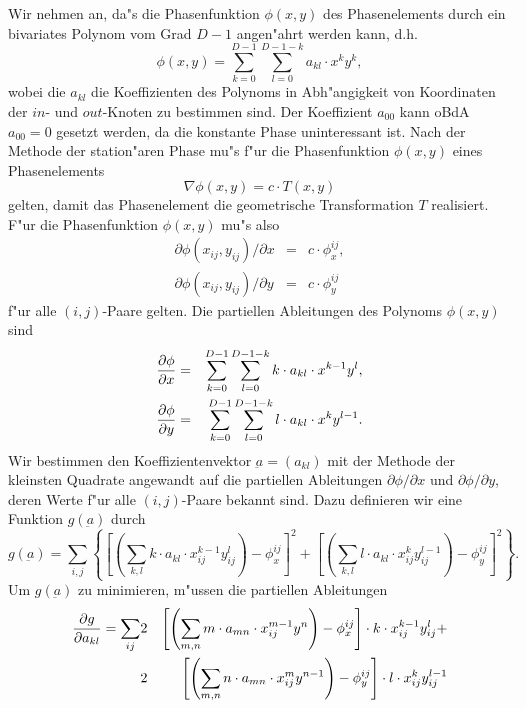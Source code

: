 \documentclass[11pt,a4paper]{article}
\begin{document}
    Wir nehmen an, da"s die Phasenfunktion $\phi(x,y)$ des Phasenelements durch ein bivariates Polynom vom 
    Grad $D-1$ angen"ahrt werden kann, d.h.
    $$ \phi(x,y) = \sum_{k=0}^{D-1}\sum_{l=0}^{D-1-k} a_{kl}\cdot x^k y^k, $$
    wobei die $a_{kl}$ die Koeffizienten des Polynoms in Abh"angigkeit von Koordinaten der
    $in$- und $out$-Knoten zu bestimmen sind. Der Koeffizient $a_{00}$ kann oBdA $a_{00}=0$ gesetzt werden,
    da die konstante Phase uninteressant ist. Nach der Methode der station"aren Phase mu"s f"ur 
    die Phasenfunktion $\phi(x,y)$ eines Phasenelements
    $$ \nabla \phi(x,y) = c \cdot T(x,y)$$
    gelten, damit das Phasenelement die geometrische Transformation $T$ realisiert. 
    F"ur die Phasenfunktion $\phi(x,y)$ mu"s also 
    \begin{eqnarray*}
      \partial\phi(x_{ij},y_{ij})/\partial x & = & c\cdot \phi_x^{ij}, \\
      \partial\phi(x_{ij},y_{ij})/\partial y & = & c\cdot \phi_y^{ij} 
    \end{eqnarray*}
    f"ur alle $(i,j)$-Paare gelten. Die partiellen Ableitungen des Polynoms $\phi(x,y)$ sind
    \begin{eqnarray*}
      {\partial\phi\over\partial x} & = & 
      \sum_{k=0}^{D-1}\sum_{l=0}^{D-1-k} k\cdot a_{kl}\cdot x^{k-1} y^l, \\
      {\partial\phi\over\partial y} & = &
      \sum_{k=0}^{D-1}\sum_{l=0}^{D-1-k} l\cdot a_{kl}\cdot x^k y^{l-1}.
    \end{eqnarray*}
    Wir bestimmen den Koeffizientenvektor $\underbar{a}=(a_{kl})$ mit der
    Methode der kleinsten Quadrate angewandt auf die partiellen Ableitungen
    $\partial\phi/\partial x$ und $\partial\phi/\partial y$, deren Werte
    f"ur alle $(i,j)$-Paare bekannt sind. Dazu definieren wir eine Funktion $g(\underbar{a})$ durch
    $$ g(\underbar{a}) = \sum_{i,j}\left\{\left[\left(
                           \sum_{k,l} k\cdot a_{kl}\cdot x_{ij}^{k-1}y_{ij}^l\right)
                           - \phi_x^{ij}\right]^2 + 
                                   \left[\left(
                           \sum_{k,l} l\cdot a_{kl}\cdot x_{ij}^k y_{ij}^{l-1}\right)
                           - \phi_y^{ij}\right]^2
                         \right\}.
    $$
    Um $g(\underbar{a})$ zu minimieren, m"ussen die partiellen Ableitungen
    \begin{eqnarray*}
    {\partial g\over \partial a_{kl}} =
       \sum_{ij} &2&\left[\left(
                          \sum_{m,n} m\cdot a_{mn}\cdot x_{ij}^{m-1}y^n\right) -
                              \phi_x^{ij}\right]\cdot k\cdot x_{ij}^{k-1} y_{ij}^l + \\
                 &2&\left[\left(
                          \sum_{m,n} n\cdot a_{mn}\cdot x_{ij}^m y^{n-1}\right) -
                              \phi_y^{ij}\right]\cdot l\cdot x_{ij}^k y_{ij}^{l-1}
    \end{eqnarray*}
\end{document}
